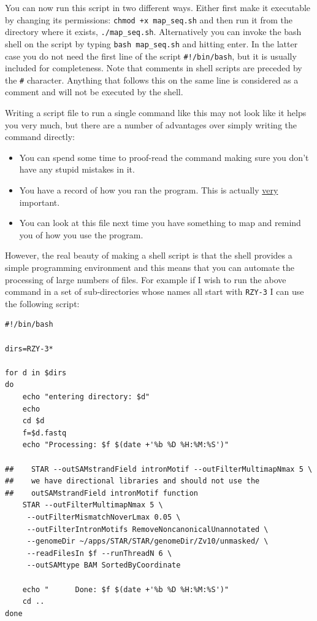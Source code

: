 \documentclass[11pt]{article}
\begin{document}
You can now run this script in two different ways. Either first make it
executable by changing its permissions: \texttt{chmod +x map\_seq.sh} and then run it
from the directory where it exists, \texttt{./map\_seq.sh}. Alternatively you can
invoke the bash shell on the script by typing \texttt{bash map\_seq.sh} and hitting
enter. In the latter case you do not need the first line of the script
\texttt{\#!/bin/bash}, but it is usually included for completeness. Note that comments
in shell scripts are preceded by the \texttt{\#} character. Anything that follows
this on the same line is considered as a comment and will not be executed by
the shell.

Writing a script file to run a single command like this may not look like it
helps you very much, but there are a number of advantages over simply writing
the command directly:
\begin{itemize}
\item You can spend some time to proof-read the command making sure you don't
have any stupid mistakes in it.
\item You have a record of how you ran the program. This is actually \uline{very}
  important.
\item You can look at this file next time you have something to map and remind
you of how you use the program.
\end{itemize}

However, the real beauty of making a shell script is that the shell provides
a simple programming environment and this means that you can automate the
processing of large numbers of files. For example if I wish to run the above
command in a set of sub-directories whose names all start with \texttt{RZY-3} I can
use the following script:

\begin{verbatim}
#!/bin/bash

dirs=RZY-3*

for d in $dirs
do
    echo "entering directory: $d"
    echo 
    cd $d
    f=$d.fastq
    echo "Processing: $f $(date +'%b %D %H:%M:%S')" 

##    STAR --outSAMstrandField intronMotif --outFilterMultimapNmax 5 \
##    we have directional libraries and should not use the 
##    outSAMstrandField intronMotif function
    STAR --outFilterMultimapNmax 5 \
	 --outFilterMismatchNoverLmax 0.05 \
	 --outFilterIntronMotifs RemoveNoncanonicalUnannotated \
	 --genomeDir ~/apps/STAR/STAR/genomeDir/Zv10/unmasked/ \
	 --readFilesIn $f --runThreadN 6 \
	 --outSAMtype BAM SortedByCoordinate

    echo "      Done: $f $(date +'%b %D %H:%M:%S')" 
    cd ..
done
\end{verbatim}
\end{document}
